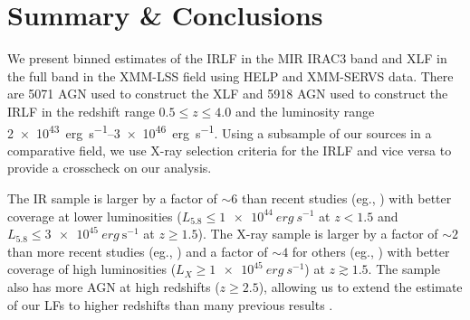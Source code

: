 \documentclass[twocolumn, trackchanges]{aastex63}
\begin{document}


\section{Summary \& Conclusions}
\label{sec:conc}
We present binned estimates of the IRLF in the MIR IRAC3 band and XLF in the full band in the XMM-LSS field using HELP and XMM-SERVS data.
There are 5071 AGN used to construct the XLF and 5918 AGN used to construct the IRLF in the redshift range $0.5 \leq z \leq 4.0$ and the luminosity range \SIrange[range-phrase=--, range-units=single]{2e43}{3e46}{erg~s^{-1}}.
Using a subsample of our sources in a comparative field, we use X-ray selection criteria for the IRLF and vice versa to provide a crosscheck on our analysis.

The IR sample is larger by a factor of $\sim 6$ than recent studies (eg., \cite{lacy_spitzer_2015}) with better coverage at lower luminosities ($L_{5.8}\leq\SI{1e44}{erg~s^{-1}}$ at $z<1.5$ and $L_{5.8}\leq\SI{3e45}{erg~\s^{-1}}$ at $z\geq1.5$).
The X-ray sample is larger by a factor of $\sim 2$ than more recent studies (eg., \cite{ranalli_210_2016}) and a factor of $\sim 4$ for others (eg., \cite{silverman_luminosity_2008}) with better coverage of high luminosities ($L_X\geq\SI{1e45}{erg~s^{-1}}$) at $z\gtrsim1.5$.
The sample also has more AGN at high redshifts ($z\geq 2.5$), allowing us to extend the estimate of our LFs to higher redshifts than many previous results \citep{aird_evolution_2010, yencho_optx_2009}.
\end{document}
